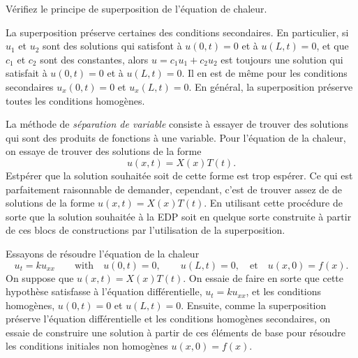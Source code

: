 \begin{exercise}
Vérifiez le principe de superposition de l'équation de chaleur.
\end{exercise}

La superposition préserve certaines des conditions secondaires.  En particulier,
si $ u_1 $ et $ u_2 $ sont des 
solutions qui satisfont à $ u (0, t) = 0 $ et à $ u (L, t) = 0 $,
et que $ c_1 $  et $ c_2 $ sont des constantes,  alors
$ u = c_1 u_1 + c_2 u_2 $ est toujours une solution
qui satisfait à $ u (0, t) = 0 $ et à  $ u (L, t) = 0 $.  Il en est de même
pour les conditions secondaires $ u_x (0, t) = 0 $ et $ u_x (L, t) = 0 $.  En général,
la superposition préserve toutes les conditions homogènes.

La méthode de 
\emph{séparation de variable} consiste à essayer de trouver des solutions qui sont des produits de fonctions à une variable.
Pour l'équation de la chaleur,  on essaye de trouver des solutions de la forme
\begin{equation*}
u(x , t) = X(x)T(t) .
\end{equation*}
Estpérer que la solution souhaitée soit de cette forme est trop
espérer.  Ce qui est parfaitement raisonnable de demander,  cependant,  c'est de trouver
assez de  de solutions de la forme
$u(x,t) = X(x)T(t)$.  En utilisant cette procédure
de sorte que la solution souhaitée à la EDP soit en quelque sorte construite à partir de ces
blocs de constructions par l'utilisation de la superposition. 

Essayons de résoudre l'équation de la chaleur
\begin{equation*}
u_t = k u_{xx}
\qquad \text{with} \quad
u(0 , t) = 0 ,\quad \quad u(L , t) = 0,
\quad \text{et} \quad u(x,0) = f(x) .
\end{equation*}
On suppose que $u(x,t) = X(x)T(t)$.  On essaie de faire en sorte que cette hypothèse satisfasse à l'équation différentielle, $ u_t = k u_ {xx} $, et les conditions homogènes,
$ u (0, t) = 0 $ et $ u (L, t) = 0 $.  Ensuite,  comme la superposition préserve l'équation différentielle et les conditions homogènes secondaires,  on essaie de
construire une solution à partir de ces éléments de base pour résoudre les
conditions initiales non homogènes $ u (x, 0) = f (x) $.

